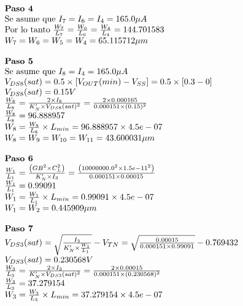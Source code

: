 \begin{equation*}
	\begin{array}{l l}
		\textbf{Paso 4} \\
		\text{Se asume que } I_{7} = I_{6} = I_{4} =  165.0 \mu A \\
		\text{Por lo tanto } \frac{W_7}{L_7} = \frac{W_6}{L_6} = \frac{W_4}{L_4} =  144.701583  \\
		W_{7} = W_{6} = W_{5} = W_{4}=  65.115712  \mu m \\
		\\
		\textbf{Paso 5} \\
		\text{Se asume que } I_{8} = I_{4} =  165.0 \mu A \\
		V_{DS8}(sat) = 0.5 \times \left[ V_{OUT}(min) - V_{SS} \right] = 0.5 \times \left[  0.3  -  0  \right] \\
		V_{DS8}(sat) =  0.15  V \\
		\frac{W_8}{L_8} = \frac{2\times I_{8}}{K'_{N}\times V_{DS8}(sat)^2} = \frac{2\times 0.000165 }{ 0.000151 \times ( 0.15 )^2} \\
		\frac{W_8}{L_8} =  96.888957  \\
		W_{8} = \frac{W_8}{L_8} \times L_{min} =  96.888957 \times 4.5e-07  \\
		W_{8} = W_{9} = W_{10} = W_{11} =  43.600031  \mu m \\
		\\
		\textbf{Paso 6} \\
		\frac{W_1}{L_1} = \frac{\left( GB^2 \times C_{L}^2 \right)}{K'_{N} \times I_{3}} = \frac{\left(  10000000.0 ^2 \times  1.5e-11 ^2 \right)}{ 0.000151  \times  0.00015 } \\
		\frac{W_1}{L_1} =  0.99091  \\
		W_{1} = \frac{W_1}{L_1} \times L_{min} =  0.99091 \times 4.5e-07  \\
		W_{1} = W_{2} =  0.445909  \mu m \\
		\\
		\textbf{Paso 7} \\
		V_{DS3}(sat) = \sqrt{\frac{I_{3}}{K'_{N} \times \frac{W_1}{L_1}}} - V_{TN} = \sqrt{\frac{ 0.00015 }{ 0.000151  \times  0.99091 }} -  0.769432  \\
		V_{DS3}(sat) =  0.230568  V \\
		\frac{W_3}{L_3} = \frac{2\times I_{3}}{K'_{N} \times V_{DS3}(sat)^2} = \frac{2\times 0.00015 }{ 0.000151 \times ( 0.230568 )^2} \\
		\frac{W_3}{L_3} =  37.279154  \\
		W_{3} = \frac{W_3}{L_3} \times L_{min} =  37.279154 \times 4.5e-07  \\

\end{array}
\end{equation*}
